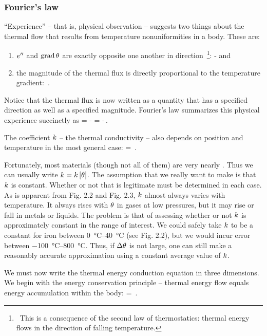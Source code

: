 \subsubsection{Fourier's law}
``Experience'' -- that is, physical observation -- suggests two things about the thermal flow that results from temperature nonuniformities in a body. These are:
\begin{enumerate}
\item ${e}^{\prime\prime}$ and $\operatorname{grad}\theta$ are exactly opposite one another in direction~\footnote{~This is a consequence of the second law of thermostatics: thermal energy flows in the direction of falling temperature.}:
\beq
\dfrac{\flux\then}{\magn{\flux\then}} \propto -\dfrac{\gder\temp}{\magn{\gder\temp}}
\eeq
and
\item the magnitude of the thermal flux is directly proportional to the temperature gradient:
\beq
\magn{\flux\then} \propto \magn{\gder\temp}\,.
\eeq
\end{enumerate}

Notice that the thermal flux is now written as a quantity that has a specified direction as well as a specified magnitude. Fourier's law summarizes this physical experience succinctly as
\beq
\flux\then = -\kthcond\gder\temp
           = -\kthcond\grad\temp\,.
\eeq

The coefficient $k$ -- the thermal conductivity -- also depends on position and temperature in the most general case:
\beq
\kthcond = \kthcond{}\,.
\eeq

Fortunately, most materials (though not all of them) are very nearly . Thus we can usually write $k = k\left[{\theta}\right]$. The assumption that we really want to make is that $k$ is constant. Whether or not that is legitimate must be determined in each case. As is apparent from Fig. 2.2 and Fig. 2.3, $k$ almost always varies with temperature. It always rises with $\theta$ in gases at low pressures, but it may rise or fall in metals or liquids. The problem is that of assessing whether or not $k$ is approximately constant in the range of interest. We could safely take $k$ to be a constant for iron between \SIrange{0}{40}{\celsius} (see Fig. 2.2), but we would incur error between \SIrange{-100}{800}{\celsius}. Thus, if $\Delta\theta$ is not large, one can still make a reasonably accurate approximation using a constant average value of $k$.

We must now write the thermal energy conduction equation in three dimensions. We begin with the energy conservation principle -- thermal energy flow equals energy accumulation within the body:
\beq
\flow\then = \accu\ien\,.
\eeq

